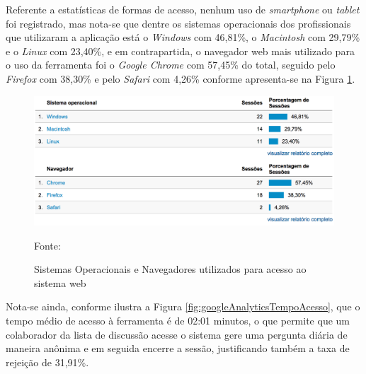 \FloatBarrier 	%
			
Referente a estatísticas de formas de acesso, nenhum uso de \textit{smartphone}
ou \textit{tablet} foi registrado, mas nota-se que dentre os sistemas
operacionais dos profissionais que utilizaram a aplicação está o
\textit{Windows} com 46,81\%, o \textit{Macintosh} com 29,79\% e o
\textit{Linux} com 23,40\%, e em contrapartida, o navegador web mais utilizado 
para o uso da ferramenta foi o \textit{Google Chrome} com 57,45\% do total,
seguido pelo \textit{Firefox} com 38,30\% e pelo \textit{Safari} com 4,26\%
conforme apresenta-se na Figura
\ref{fig:googleAnalyticsSistemaOperacionalNavegador}.

\begin{figure}[h!tb]
	\caption{Sistemas Operacionais e Navegadores utilizados para acesso ao
	sistema web}
	\label{fig:googleAnalyticsSistemaOperacionalNavegador}

	\centering
	\includegraphics[width=\textwidth]{images/resultados/google-analytics-os-browser.png}

	\centering
	\footnotesize Fonte: \fonteOAutor
\end{figure}

\FloatBarrier 	%

Nota-se ainda, conforme ilustra a Figura \ref{fig:googleAnalyticsTempoAcesso},
que o tempo médio de acesso à ferramenta é de 02:01 minutos, o que permite que
um colaborador da lista de discussão acesse o sistema gere uma pergunta diária de
maneira anônima e em seguida encerre a sessão, justificando também a taxa de
rejeição de 31,91\%.

